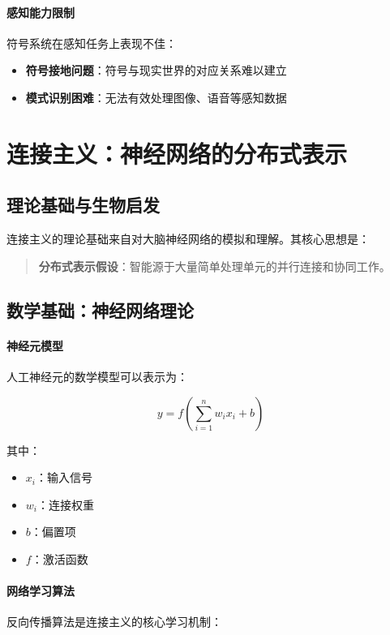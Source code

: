 \paragraph{感知能力限制}
符号系统在感知任务上表现不佳：
\begin{itemize}
\item \textbf{符号接地问题}：符号与现实世界的对应关系难以建立
\item \textbf{模式识别困难}：无法有效处理图像、语音等感知数据
\end{itemize}

\section{连接主义：神经网络的分布式表示}

\subsection{理论基础与生物启发}

连接主义的理论基础来自对大脑神经网络的模拟和理解。其核心思想是：

\begin{quote}
\textbf{分布式表示假设}：智能源于大量简单处理单元的并行连接和协同工作。
\end{quote}

\subsection{数学基础：神经网络理论}

\paragraph{神经元模型}
人工神经元的数学模型可以表示为：

$$y = f\left(\sum_{i=1}^{n} w_i x_i + b\right)$$

其中：
\begin{itemize}
\item $x_i$：输入信号
\item $w_i$：连接权重
\item $b$：偏置项
\item $f$：激活函数
\end{itemize}

\paragraph{网络学习算法}
反向传播算法是连接主义的核心学习机制：

